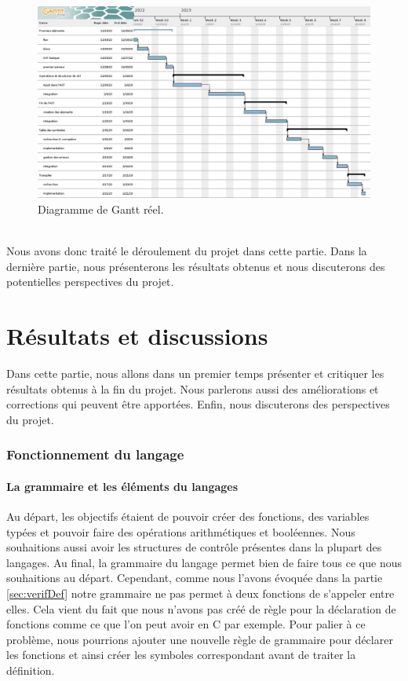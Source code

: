 \documentclass[a4paper]{article}%
\begin{document}
\begin{figure}[h!]
  \begin{center}
  \includegraphics[scale=0.35]{./img/real-project.png}
  \caption{Diagramme de Gantt réel.}
  \end{center}
\end{figure}~\\

Nous avons donc traité le déroulement du projet dans cette partie. Dans la
dernière partie, nous présenterons les résultats obtenus et nous discuterons des
potentielles perspectives du projet.

\clearpage
\part{Résultats et discussions}

Dans cette partie, nous allons dans un premier temps présenter et critiquer les
résultats obtenus à la fin du projet. Nous parlerons aussi des améliorations et
corrections qui peuvent être apportées. Enfin, nous discuterons des perspectives
du projet.

\section{Fonctionnement du langage}

\subsection{La grammaire et les éléments du langages}

Au départ, les objectifs étaient de pouvoir créer des fonctions, des variables
typées et pouvoir faire des opérations arithmétiques et booléennes. Nous
souhaitions aussi avoir les structures de contrôle présentes dans la plupart des
langages. Au final, la grammaire du langage permet bien de faire tous ce que
nous souhaitions au départ. Cependant, comme nous l'avons évoquée dans la partie
\ref{sec:verifDef} notre grammaire ne pas permet à deux fonctions de s'appeler
entre elles. Cela vient du fait que nous n'avons pas créé de règle pour la
déclaration de fonctions comme ce que l'on peut avoir en C par exemple. Pour
palier à ce problème, nous pourrions ajouter une nouvelle règle de grammaire
pour déclarer les fonctions et ainsi créer les symboles correspondant avant de
traiter la définition.\\
\end{document}
